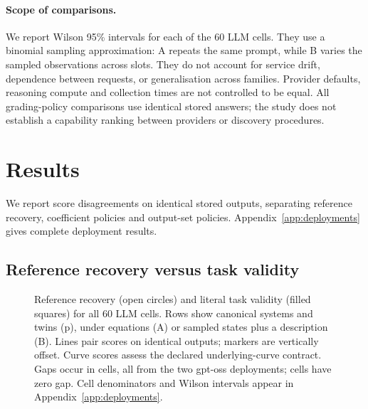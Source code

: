 \documentclass[10pt]{article}
\begin{document}
\paragraph{Scope of comparisons.} We report Wilson 95\% intervals for each of the 60 LLM cells. They use a binomial sampling approximation: A repeats the same prompt, while B varies the sampled observations across slots. They do not account for service drift, dependence between requests, or generalisation across families. Provider defaults, reasoning compute and collection times are not controlled to be equal. All grading-policy comparisons use identical stored answers; the study does not establish a capability ranking between providers or discovery procedures.

\section{Results}\label{sec:results}

We report score disagreements on identical stored outputs, separating reference recovery, coefficient policies and output-set policies. Appendix~\ref{app:deployments} gives complete deployment results.

\subsection{Reference recovery versus task validity}

\begin{figure}[t]
\centering
{}
\caption{Reference recovery (open circles) and literal task validity (filled squares) for all 60 LLM cells. Rows show canonical systems and twins (p), under equations (A) or sampled states plus a description (B). Lines pair scores on identical outputs; markers are vertically offset. Curve scores assess the declared underlying-curve contract. Gaps occur in \nGapCells{} cells, all from the two gpt-oss deployments; \nZeroGapCells{} cells have zero gap. Cell denominators and Wilson intervals appear in Appendix~\ref{app:deployments}. }
\label{fig:metric-gap}
\end{figure}
\end{document}
